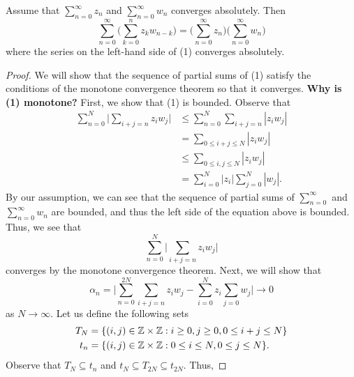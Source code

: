 \documentclass[a4paper]{report}
\begin{document}
\begin{theorem}
    Assume that \( \sum_{ n = 0  }^{  \infty  } {z}_{n} \) and \( \sum_{ n=0  }^{  \infty  } {w}_{n}  \) converges absolutely. Then 
    \[  \sum_{ n=0 }^{ \infty  } \Big(  \sum_{ k=0  }^{ n } {z}_{k } {w}_{n-k} \Big) = \Big(  \sum_{  n = 0  }^{ \infty  } {z}_{n} \Big) \Big(  \sum_{ n= 0  }^{ \infty  } {w}_{n} \Big) \tag{1} \]
where the series on the left-hand side of (1) converges absolutely.
\end{theorem}
\begin{proof}
We will show that the sequence of partial sums of (1) satisfy the conditions of the monotone convergence theorem so that it converges. \textbf{Why is (1) monotone?} First, we show that (1) is bounded. Observe that
\begin{align*}
    \sum_{ n = 0    }^{ N  }  \Big|  \sum_{ i + j = n  }^{  } {z}_{i} {w}_{j} \Big|  &\leq \sum_{ n = 0  }^{ N  } \sum_{ i + j = n  }^{   } | {z}_{i} {w}_{j} |  \\
                                                                                     &= \sum_{ 0 \leq i + j \leq N   }^{  }| {z}_{i} {w}_{j} | \\ 
                                                                                     &\leq \sum_{ 0 \leq i, j \leq N  }^{  } | {z}_{i} {w}_{j} | \\
                                                                                     &= \sum_{i = 0  }^{ N  } | {z}_{i}  |  \sum_{ j=0  }^{ N  } | {w}_{j} |. 
\end{align*}
By our assumption, we can see that the sequence of partial sums of \( \sum_{ n= 0  }^{  \infty  }    \) and \( \sum_{ n = 0  }^{  \infty  } {w}_{n} \) are bounded, and thus the left side of the equation above is bounded. Thus, we see that 
\[  \sum_{ n = 0  }^{  N  } \Big|  \sum_{  i + j = n  }^{   } {z}_{i} {w}_{j} \Big|  \] 
converges by the monotone convergence theorem. Next, we will show that 
\[  {\alpha}_{n} = \Big|  \sum_{ n = 0  }^{ 2N  } \sum_{  i + j = n  } {z}_{i} {w}_{j} - \sum_{ i = 0  }^{ N  } {z}_{i} \sum_{ j = 0  } {w}_{j}  \Big| \to 0  \]
as \( N \to \infty  \). Let us define the following sets
\begin{align*}
    {T}_{N} &= \{ (i,j) \in \mathbb{Z} \times \mathbb{Z} : i \geq 0 , j \geq 0, 0 \leq i + j \leq N  \}  \\
    {t}_{n} &= \{ (i,j) \in \mathbb{Z} \times \mathbb{Z} : 0 \leq i \leq N , 0 \leq j \leq N  \}.
\end{align*}
Observe that \( {T}_{N} \subseteq  {t}_{n} \) and \( {t}_{N} \subseteq  {T}_{2N } \subseteq  {t}_{2N} \). Thus, 

\end{proof}
\end{document}
